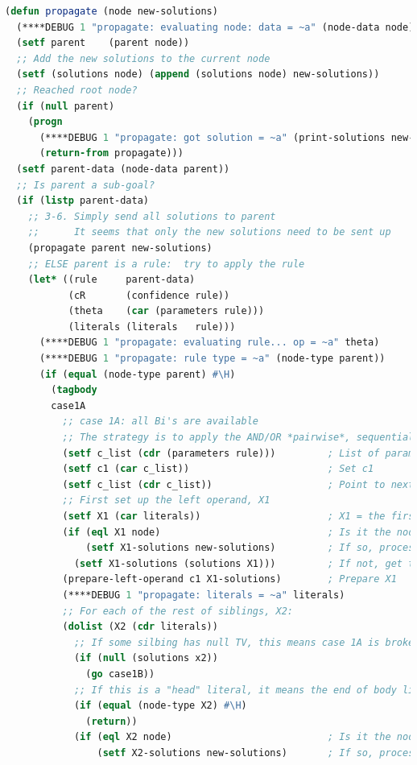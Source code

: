 \begin{lstlisting}[language=Lisp]
(defun propagate (node new-solutions)
  (****DEBUG 1 "propagate: evaluating node: data = ~a" (node-data node))
  (setf parent    (parent node))
  ;; Add the new solutions to the current node
  (setf (solutions node) (append (solutions node) new-solutions))
  ;; Reached root node?
  (if (null parent)
    (progn
      (****DEBUG 1 "propagate: got solution = ~a" (print-solutions new-solutions))
      (return-from propagate)))
  (setf parent-data (node-data parent))
  ;; Is parent a sub-goal?
  (if (listp parent-data)
    ;; 3-6. Simply send all solutions to parent
    ;;      It seems that only the new solutions need to be sent up
    (propagate parent new-solutions)
    ;; ELSE parent is a rule:  try to apply the rule
    (let* ((rule     parent-data)
           (cR       (confidence rule))
           (theta    (car (parameters rule)))
           (literals (literals   rule)))
      (****DEBUG 1 "propagate: evaluating rule... op = ~a" theta)
      (****DEBUG 1 "propagate: rule type = ~a" (node-type parent))
      (if (equal (node-type parent) #\H)
        (tagbody
        case1A
          ;; case 1A: all Bi's are available
          ;; The strategy is to apply the AND/OR *pairwise*, sequentially.
          (setf c_list (cdr (parameters rule)))         ; List of parameters c1,c2,...
          (setf c1 (car c_list))                        ; Set c1
          (setf c_list (cdr c_list))                    ; Point to next element
          ;; First set up the left operand, X1
          (setf X1 (car literals))                      ; X1 = the first literal
          (if (eql X1 node)                             ; Is it the node with new solutions?
              (setf X1-solutions new-solutions)         ; If so, process new-solutions *only*
            (setf X1-solutions (solutions X1)))         ; If not, get the set of old solutions
          (prepare-left-operand c1 X1-solutions)        ; Prepare X1
          (****DEBUG 1 "propagate: literals = ~a" literals)
          ;; For each of the rest of siblings, X2:
          (dolist (X2 (cdr literals))
            ;; If some silbing has null TV, this means case 1A is broken, try case 1B
            (if (null (solutions x2))
              (go case1B))
            ;; If this is a "head" literal, it means the end of body literals, signals success
            (if (equal (node-type X2) #\H)
              (return))
            (if (eql X2 node)                           ; Is it the node with new solutions?
                (setf X2-solutions new-solutions)       ; If so, process new-solutions *only*

\end{lstlisting}
